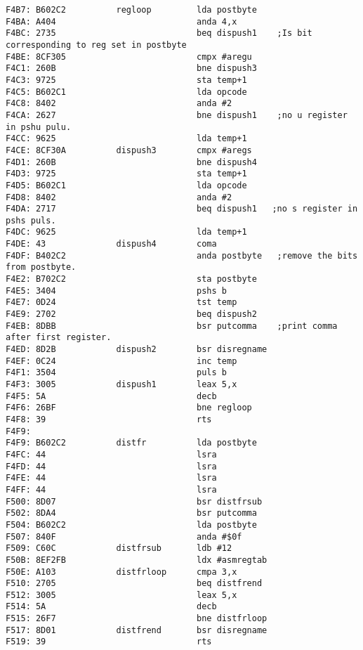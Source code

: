 {\begin{verbatim}
F4B7: B602C2          regloop         lda postbyte
F4BA: A404                            anda 4,x                
F4BC: 2735                            beq dispush1    ;Is bit corresponding to reg set in postbyte
F4BE: 8CF305                          cmpx #aregu
F4C1: 260B                            bne dispush3
F4C3: 9725                            sta temp+1
F4C5: B602C1                          lda opcode
F4C8: 8402                            anda #2
F4CA: 2627                            bne dispush1    ;no u register in pshu pulu.
F4CC: 9625                            lda temp+1              
F4CE: 8CF30A          dispush3        cmpx #aregs
F4D1: 260B                            bne dispush4
F4D3: 9725                            sta temp+1
F4D5: B602C1                          lda opcode
F4D8: 8402                            anda #2
F4DA: 2717                            beq dispush1   ;no s register in pshs puls.
F4DC: 9625                            lda temp+1
F4DE: 43              dispush4        coma
F4DF: B402C2                          anda postbyte   ;remove the bits from postbyte.
F4E2: B702C2                          sta postbyte
F4E5: 3404                            pshs b          
F4E7: 0D24                            tst temp
F4E9: 2702                            beq dispush2
F4EB: 8DBB                            bsr putcomma    ;print comma after first register.
F4ED: 8D2B            dispush2        bsr disregname
F4EF: 0C24                            inc temp
F4F1: 3504                            puls b
F4F3: 3005            dispush1        leax 5,x
F4F5: 5A                              decb
F4F6: 26BF                            bne regloop             
F4F8: 39                              rts
F4F9:                 
F4F9: B602C2          distfr          lda postbyte
F4FC: 44                              lsra
F4FD: 44                              lsra
F4FE: 44                              lsra
F4FF: 44                              lsra
F500: 8D07                            bsr distfrsub
F502: 8DA4                            bsr putcomma
F504: B602C2                          lda postbyte
F507: 840F                            anda #$0f
F509: C60C            distfrsub       ldb #12
F50B: 8EF2FB                          ldx #asmregtab
F50E: A103            distfrloop      cmpa 3,x
F510: 2705                            beq distfrend
F512: 3005                            leax 5,x
F514: 5A                              decb
F515: 26F7                            bne distfrloop
F517: 8D01            distfrend       bsr disregname
F519: 39                              rts

\end{verbatim}}

